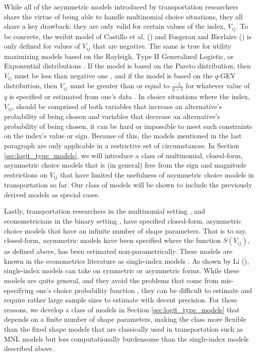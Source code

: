 While all of the asymmetric models introduced by transportation researchers share the virtue of being able to handle multinomial choice situations, they all share a key drawback: they are only valid for certain values of the index, $V_{ij}$. To be concrete, the weibit model of Castillo et al. (\citeyear{castillo_closed_2008}) and Fosgerau and Bierlaire (\citeyear{fosgerau_discrete_2009}) is only defined for values of $V_{ij}$ that are negative. The same is true for utility maximizing models based on the Rayleigh, Type II Generalized Logistic, or Exponential distributions \citep{li_multinomial_2011}. If the model is based on the Pareto distribution, then $V_{ij}$ must be less than negative one \citep{li_multinomial_2011, mattsson_extreme_2014}, and if the model is based on the $q$-GEV distribution, then $V_{ij}$ must be greater than or equal to $\frac{-1}{q - 1}$ for whatever value of $q$ is specified or estimated from one's data \citep{nakayama_unified_2015}. In choice situations where the index, $V_{ij}$, should be comprised of both variables that increase an alternative's probability of being chosen and variables that decrease an alternative's probability of being chosen, it can be hard or impossible to meet such constraints on the index's value or sign. Because of this, the models mentioned in the last paragraph are only applicable in a restrictive set of circumstances. In Section \ref{sec:logit_type_models}, we will introduce a class of multinomial, closed-form, asymmetric choice models that is (in general) free from the sign and magnitude restrictions on  $V_{ij}$ that have limited the usefulness of asymmetric choice models in transportation so far. Our class of models will be shown to include the previously derived models as special cases.

Lastly, transportation researchers in the multinomial setting \citep{li_multinomial_2011}, and econometricians in the binary setting \citep{horowitz_semiparametric_1993}, have specified closed-form, asymmetric choice models that have an infinite number of shape parameters. That is to say, closed-form, asymmetric models have been specified where the function $S \left( V_{ij} \right)$, as defined above, has been estimated non-parametrically. These models are known in the econometrics literature as single-index models \citep{hardle_semiparametric_1997, horowitz_semiparametric_2010}. As shown by Li (\citeyear{li_multinomial_2011}), single-index models can take on symmetric or asymmetric forms. While these models are quite general, and they avoid the problems that come from mis-specifying one's choice probability function \citep{czado_effect_1992, koenker_parametric_2009}, they can be difficult to estimate and require rather large sample sizes to estimate with decent precision. For these reasons, we develop a class of models in Section \ref{sec:logit_type_models} that depends on a finite number of shape parameters, making the class more flexible than the fixed shape models that are classically used in transportation such as MNL models but less computationally burdensome than the single-index models described above.

